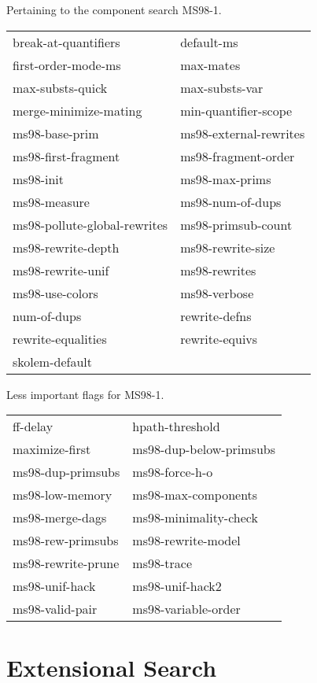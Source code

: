 \begin{description} 
\item[MS98-1]  
Pertaining to the component search MS98-1.

\begin{tabular}{l l}
break-at-quantifiers&default-ms\\
first-order-mode-ms&max-mates\\
max-substs-quick&max-substs-var\\
merge-minimize-mating&min-quantifier-scope\\
ms98-base-prim&ms98-external-rewrites\\
ms98-first-fragment&ms98-fragment-order\\
ms98-init&ms98-max-prims\\
ms98-measure&ms98-num-of-dups\\
ms98-pollute-global-rewrites&ms98-primsub-count\\
ms98-rewrite-depth&ms98-rewrite-size\\
ms98-rewrite-unif&ms98-rewrites\\
ms98-use-colors&ms98-verbose\\
num-of-dups&rewrite-defns\\
rewrite-equalities&rewrite-equivs\\
skolem-default
\end{tabular}

\item[MS98-MINOR]  
Less important flags for MS98-1.

\begin{tabular}{l l}
ff-delay&hpath-threshold\\
maximize-first&ms98-dup-below-primsubs\\
ms98-dup-primsubs&ms98-force-h-o\\
ms98-low-memory&ms98-max-components\\
ms98-merge-dags&ms98-minimality-check\\
ms98-rew-primsubs&ms98-rewrite-model\\
ms98-rewrite-prune&ms98-trace\\
ms98-unif-hack&ms98-unif-hack2\\
ms98-valid-pair&ms98-variable-order\\
\end{tabular}
\item
\end{description}

\section{Extensional Search}

